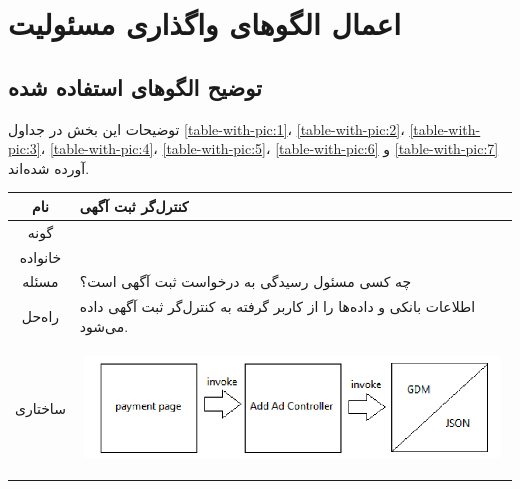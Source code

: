 \newcommand{\grasp}{\lr{GRASP}}
\newcommand{\controller}{\lr{Controller Pattern}}
\newcommand{\expert}{\lr{Expert Pattern}}

\chapter{اعمال الگو‌های واگذاری مسئولیت}
\section{توضیح الگو‌های استفاده شده}
توضیحات این بخش در جداول 
\ref{table-with-pic:1}،
\ref{table-with-pic:2}،
\ref{table-with-pic:3}،
\ref{table-with-pic:4}،
\ref{table-with-pic:5}،
\ref{table-with-pic:6} و 
\ref{table-with-pic:7}
آورده شده‌اند.

\begin{table}[H]
\begin{adjustbox}{width=\textwidth}
\begin{tabular}{|c|p{\textwidth}|}
\hline
نام &
کنترل‌گر ثبت آگهی \\ 
\hline
گونه & 
\grasp \\
\hline
خانواده &
\controller \\
\hline
مسئله & 
چه کسی مسئول رسیدگی به درخواست ثبت آگهی است؟\\
\hline
راه‌حل& 
اطلاعات بانکی و داده‌ها را از کاربر گرفته به کنترل‌گر ثبت آگهی داده می‌شود. \\
\hline
ساختاری & 
\begin{minipage}{\textwidth}
	\begin{flushleft}
		\begin{minipage}{\textwidth}
			\includegraphics[width=13cm, height=2.7cm]{./images/7-1-1}
		\end{minipage}
	\end{flushleft}
\end{minipage}
	

\end{tabular}
\end{adjustbox}
\end{table}

